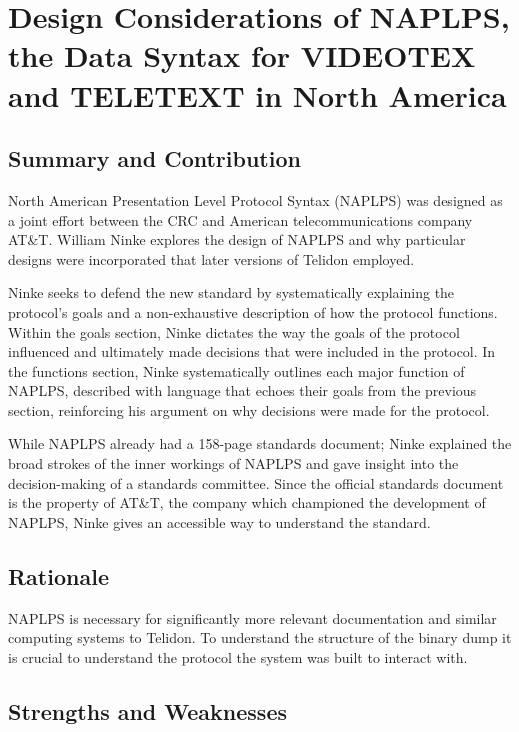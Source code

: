 \documentclass[sigconf]{acmart}
\begin{document}
\section{Design Considerations of NAPLPS, the Data Syntax for VIDEOTEX and TELETEXT in North America}


\subsection{Summary and Contribution}

North American Presentation Level Protocol Syntax (NAPLPS) was designed as a joint effort between the CRC and American telecommunications company AT\&T. William Ninke explores the design of NAPLPS and why particular designs were incorporated that later versions of Telidon employed.

Ninke seeks to defend the new standard by systematically explaining the protocol's goals and a non-exhaustive description of how the protocol functions. Within the goals section, Ninke dictates the way the goals of the protocol influenced and ultimately made decisions that were included in the protocol. In the functions section, Ninke systematically outlines each major function of NAPLPS, described with language that echoes their goals from the previous section, reinforcing his argument on why decisions were made for the protocol.

While NAPLPS already had a 158-page standards document; Ninke explained the broad strokes of the inner workings of NAPLPS and gave insight into the decision-making of a standards committee. Since the official standards document is the property of AT\&T, the company which championed the development of NAPLPS, Ninke gives an accessible way to understand the standard. 

\subsection{Rationale}

NAPLPS is necessary for significantly more relevant documentation and similar computing systems to Telidon. To understand the structure of the binary dump it is crucial to understand the protocol the system was built to interact with. 

\subsection{Strengths and Weaknesses}
\end{document}
